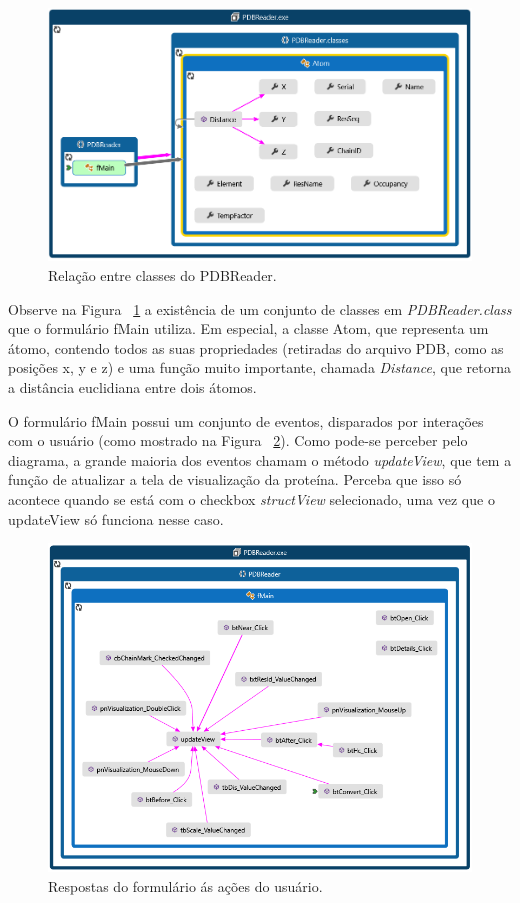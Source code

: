 \documentclass[a4paper,12pt]{article}
\begin{document}
	 \begin{figure}[H]
	 	\begin{center}
	 		\includegraphics[width=0.9\linewidth]{classDiagram.png}
 		\end{center}
	 	\caption{Relação entre classes do PDBReader.}
	 	\label{fig:classDiagram}
	 \end{figure}
 
 	Observe na Figura ~\ref{fig:classDiagram} a existência de um conjunto de classes em \textit{PDBReader.class} que o formulário fMain utiliza. Em especial, a classe Atom, que representa um átomo, contendo todos as suas propriedades (retiradas do arquivo PDB, como as posições x, y e z) e uma função muito importante, chamada \textit{Distance}, que retorna a distância euclidiana entre dois átomos.
 	
 	O formulário fMain possui um conjunto de eventos, disparados por interações com o usuário (como mostrado na Figura ~\ref{fig:fmain}). Como pode-se perceber pelo diagrama, a grande maioria dos eventos chamam o método \textit{updateView}, que tem a função de atualizar a tela de visualização da proteína. Perceba que isso só acontece quando se está com o checkbox \textit{structView} selecionado, uma vez que o updateView só funciona nesse caso.
	
	\begin{figure}[H]
		\begin{center}
			\includegraphics[width=0.86\linewidth]{fmainClassDiagram.png}
		\end{center}
		\caption{Respostas do formulário ás ações do usuário.}
		\label{fig:fmain}
	\end{figure}
	
\end{document}
